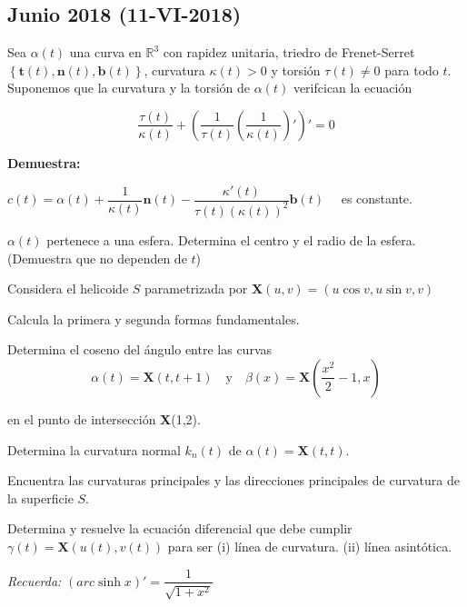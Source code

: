 \subsection{Junio 2018 (11-VI-2018)}

\begin{problem}
	
Sea $\alpha(t)$ una curva en $\mathbb{R}^3$ con rapidez unitaria, triedro de Frenet-Serret $\left\{\textbf{t}(t), \textbf{n}(t), \textbf{b}(t) \right\}$, curvatura $\kappa(t) > 0$ y torsión $\tau(t) \neq 0$ para todo $t$. Suponemos que la curvatura y la torsión de $\alpha(t)$ verifcican la ecuación


\begin{equation*}
\dfrac{\tau(t)}{\kappa(t)} + \left(\dfrac{1}{\tau(t)} \left(\dfrac{1}{\kappa(t)}\right)'\right)' = 0
\end{equation*}

\textbf{Demuestra:}

\ppart $c(t) = \alpha(t) + \dfrac{1}{\kappa(t)}\textbf{n}(t) - \dfrac{\kappa'(t)}{\tau(t)(\kappa(t))^2}\textbf{b}(t) \quad$ es constante.
	
\ppart $\alpha(t)$ pertenece a una esfera. Determina el centro y el radio de la esfera. (Demuestra que no dependen de $t$)


\solution

\end{problem}







\begin{problem}
	
Considera el helicoide $S$ parametrizada por $\textbf{X}(u,v) = (u\cos v, u\sin v, v)$

\ppart Calcula la primera y segunda formas fundamentales.
	
\ppart Determina el coseno del ángulo entre las curvas
\begin{equation*}
\alpha(t) = \textbf{X}\left(t, t+1\right) \quad \text{y} \quad \beta(x) = \textbf{X}\left(\dfrac{x^2}{2}-1, x\right)
\end{equation*}

en el punto de intersección \textbf{X}(1,2).

\ppart Determina la curvatura normal $k_n(t)$ de $\alpha(t) = \textbf{X} \left(t, t\right).$

\ppart Encuentra las curvaturas principales y las direcciones principales de curvatura de la superficie $S$.

\ppart Determina y resuelve la ecuación diferencial que debe cumplir $\gamma(t) = \textbf{X}(u(t), v(t))$ para ser (i) línea de curvatura. (ii) línea asintótica.

\textit{Recuerda:} $(arc\sinh x)' = \dfrac{1}{\sqrt{1+x^2}}$

\solution

\end{problem}






